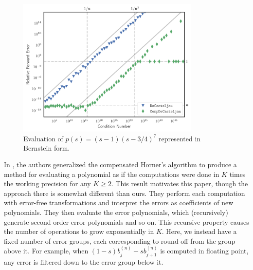 \begin{figure}
  \includegraphics[width=0.8125\textwidth]{../images/k-compensated/jlcs10_plot.pdf}
  \centering
  \captionsetup{width=.75\linewidth}
  \caption{Evaluation of \(p(s) = (s - 1)\left(s - 3/4\right)^7\)
    represented in Bernstein form.}
  \label{fig:jlcs-10}
\end{figure}

In \cite{Graillat2009}, the authors generalized the compensated Horner's
algorithm to produce a method for evaluating a polynomial as if
the computations were done in \(K\) times the working precision for
any \(K \geq 2\). This result motivates this paper, though the
approach there is somewhat different than ours. They perform each computation
with error-free transformations and interpret the errors as coefficients of new
polynomials. They then evaluate the error polynomials, which (recursively)
generate second order error polynomials and so on. This recursive property
causes the number of operations to grow exponentially in \(K\). Here, we
instead have a fixed number of error groups, each corresponding to round-off
from the group above it. For example, when
\((1 - s) b_j^{(n)} + s b_{j + 1}^{(n)}\) is computed in floating point, any
error is filtered down to the error group below it.

